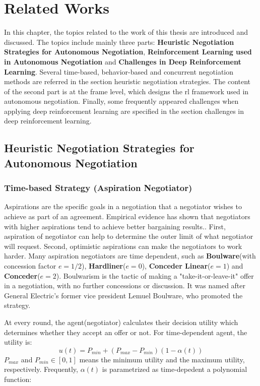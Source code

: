 \chapter{Related Works}
In this chapter, the topics related to the work of this thesis are introduced and discussed. The topics include mainly three parts: \textbf{Heuristic Negotiation Strategies for Autonomous Negotiation}, \textbf{Reinforcement Learning used in Autonomous Negotiation} and \textbf{Challenges in Deep Reinforcement Learning}. Several time-based, behavior-based and concurrent negotiation methods are referred in the section heuristic negotiation strategies. The content of the second part is at the frame level, which designs the \gls{rl} framework used in autonomous negotiation. Finally, some frequently appeared challenges when applying deep reinforcement learning are specified in the section challenges in deep reinforcement learning.

\section{Heuristic Negotiation Strategies for Autonomous Negotiation} \label{related-work:heuristic-negotiation}
\subsection{Time-based Strategy (Aspiration Negotiator)}
Aspirations are the specific goals in a negotiation that a negotiator wishes to achieve as part of an agreement. Empirical evidence has shown that negotiators with higher aspirations tend to achieve better bargaining results.. First, aspiration of negotiator can help to determine the outer limit of what negotiator will request. Second, optimistic aspirations can make the negotiators to work harder\parencite{Schneider2004}. Many aspiration negotiators are time dependent, such as \textbf{Boulware}(with concession factor $e=1/2$), \textbf{Hardliner}($e=0$), \textbf{Conceder Linear}($e=1$) and \textbf{Conceder}($e=2$)\parencite{FARATIN1998159}. Boulwarism is the tactic of making a "take-it-or-leave-it" offer in a negotiation, with no further concessions or discussion. It was named after General Electric's former vice president Lemuel Boulware, who promoted the strategy\parencite{William1991}.

At every round, the agent(negotiator) calculates their decision utility which determines whether they accept an offer or not. For time-dependent agent, the utility is:
\begin{equation}
u(t) = P_{min} + (P_{max} - P_{min})(1-\alpha(t))
\end{equation}
$P_{max}$ and $P_{min} \in [0, 1]$ means the minimum utility and the maximum utility, respectively. Frequently, $\alpha(t)$ is parametrized as time-depedent a polynomial function: 

